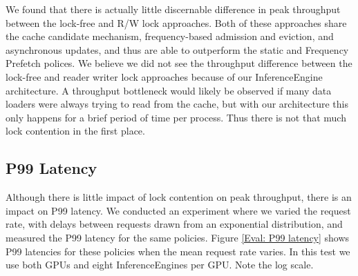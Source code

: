 We found that there is actually little discernable difference in peak throughput between the lock-free and R/W lock approaches. Both of these approaches share the cache candidate mechanism, frequency-based admission and eviction, and asynchronous updates, and thus are able to outperform the static and Frequency Prefetch polices. We believe we did not see the throughput difference between the lock-free and reader writer lock approaches because of our InferenceEngine architecture. A throughput bottleneck would likely be observed if many data loaders were always trying to read from the cache, but with our architecture this only happens for a brief period of time per process. Thus there is not that much lock contention in the first place.

\subsection{P99 Latency}
Although there is little impact of lock contention on peak throughput, there is an impact on P99 latency. We conducted an experiment where we varied the request rate, with delays between requests drawn from an exponential distribution, and measured the P99 latency for the same policies. Figure \ref{Eval: P99 latency} shows P99 latencies for these policies when the mean request rate varies. In this test we use both GPUs and eight InferenceEngines per GPU. Note the log scale.

